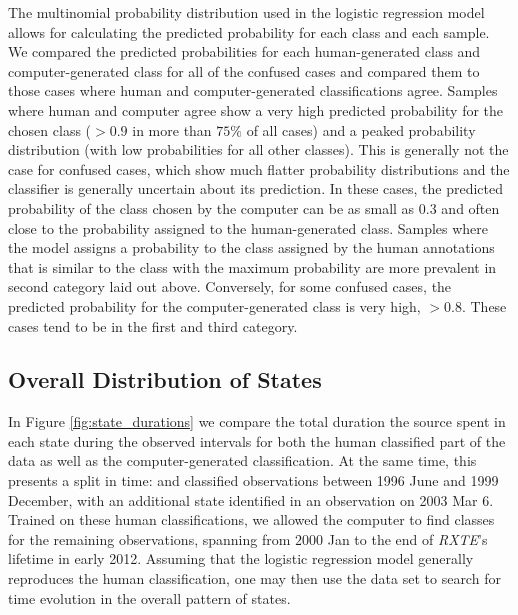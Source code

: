 \documentclass[12pt]{emulateapj}
\newcommand{\project}[1]{\textsl{#1}}
\newcommand{\rxte}{\project{RXTE}}
\begin{document}
The multinomial probability distribution used in the logistic regression model allows for calculating the predicted probability for each class and each sample. We compared the predicted probabilities for each human-generated class and computer-generated class for all of the confused cases and compared them to those cases where human and computer-generated classifications agree. Samples where human and computer agree show a very high predicted probability for the chosen class ($>0.9$ in more than $75\%$ of all cases) and a peaked probability distribution (with low probabilities for all other classes). This is generally not the case for confused cases, which show much flatter probability distributions and the classifier is generally uncertain about its prediction. In these cases, the predicted probability of the class chosen by the computer can be as small as $0.3$ and often close to the probability assigned to the human-generated class. Samples where the model assigns a probability to the class assigned by the human annotations that is similar to the class with the maximum probability are more prevalent in second category laid out above. Conversely, for some confused cases, the predicted probability for the computer-generated class is very high, $>0.8$. These cases tend to be in the first and third category. 
\subsection{Overall Distribution of States}

In Figure \ref{fig:state_durations} we compare the total duration the source spent in each state during the observed intervals for both the human classified part of the data as well as the computer-generated classification. At the same time, this presents a split in time: \citet{belloni2000} and \citet{kleinwolt2002} classified observations between 1996 June and 1999 December, with an additional state identified in an observation on 2003 Mar 6. Trained on these human classifications,
we allowed the computer to find classes for the remaining observations, spanning from $2000$ Jan to the end of \rxte's lifetime in early 2012. 
Assuming that the logistic regression model generally reproduces the human classification, one may then use the data set to search for time evolution in the overall pattern of states. 
\end{document}
